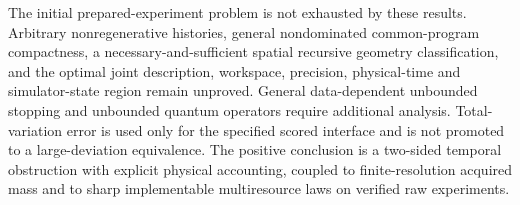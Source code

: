 The initial prepared-experiment problem is not exhausted by these results. Arbitrary nonregenerative histories, general nondominated common-program compactness, a necessary-and-sufficient spatial recursive geometry classification, and the optimal joint description, workspace, precision, physical-time and simulator-state region remain unproved. General data-dependent unbounded stopping and unbounded quantum operators require additional analysis. Total-variation error is used only for the specified scored interface and is not promoted to a large-deviation equivalence. The positive conclusion is a two-sided temporal obstruction with explicit physical accounting, coupled to finite-resolution acquired mass and to sharp implementable multiresource laws on verified raw experiments.

